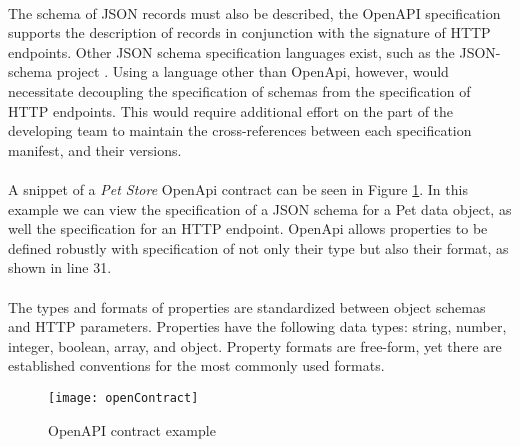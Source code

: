 \paragraph{}

The schema of JSON records must also be described,
the OpenAPI specification supports the description of records
in conjunction with the signature of HTTP endpoints.
Other JSON schema specification languages exist, such as the JSON-schema project \cite{jsonschema}.
Using a language other than OpenApi, however, would necessitate decoupling the specification of schemas from the specification of HTTP endpoints.
This would require additional effort on the part of the developing team to maintain the cross-references
between each specification manifest, and their versions.

\paragraph{}

A snippet of a \textit{Pet Store} OpenApi contract can be seen in Figure \ref{fig:open_contract}.
In this example we can view the specification of a JSON schema for a Pet data object,
as well the specification for an HTTP endpoint.
OpenApi allows properties to be defined robustly with specification of not only their type but also their format, as shown in line 31.

\paragraph{}

The types and formats of properties are standardized between object schemas and HTTP parameters.
Properties have the following data types: string, number, integer, boolean, array, and object.
Property formats are free-form, yet there are established conventions for the most commonly used formats.

\begin{figure}[htbp]
    \centering
    \centerline{\texttt{[image: openContract]}}
    \caption{OpenAPI contract example}
    \label{fig:open_contract}
\end{figure}

\newpage

